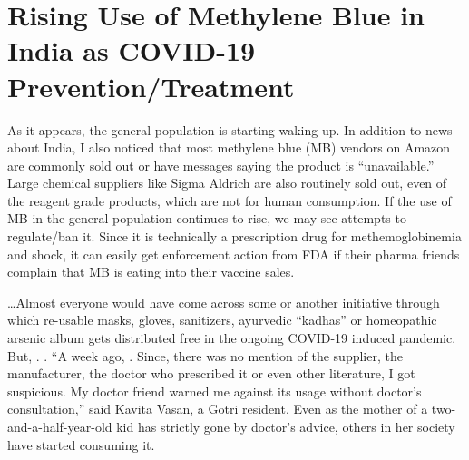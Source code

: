 \chapter{Rising Use of Methylene Blue in India as COVID-19 Prevention/Treatment}

\begin{refsection}

As it appears, the general population is starting waking up. In addition to news about India, I also noticed that most methylene blue (MB) vendors on Amazon are commonly sold out or have messages saying the product is \enquote{unavailable.} Large chemical suppliers like Sigma Aldrich are also routinely sold out, even of the reagent grade products, which are not for human consumption. If the use of MB in the general population continues to rise, we may see attempts to regulate/ban it. Since it is technically a prescription drug for methemoglobinemia and shock, it can easily get enforcement action from FDA if their pharma friends complain that MB is eating into their vaccine sales.

\begin{tcolorbox}[quote]

\dots{}Almost everyone would have come across some or another initiative through which re-usable masks, gloves, sanitizers, ayurvedic \enquote{kadhas} or homeopathic arsenic album gets distributed free in the ongoing COVID-19 induced pandemic. But, . . \enquote{A week ago, . Since, there was no mention of the supplier, the manufacturer, the doctor who prescribed it or even other literature, I got suspicious. My doctor friend warned me against its usage without doctor's consultation,} said Kavita Vasan, a Gotri resident. Even as the mother of a two-and-a-half-year-old kid has strictly gone by doctor's advice, others in her society have started consuming it.\textsuperscript{\cite{urlsad09u2s}}

\end{tcolorbox}

\begin{tcolorbox}[quote]


\end{tcolorbox}
\end{refsection}
